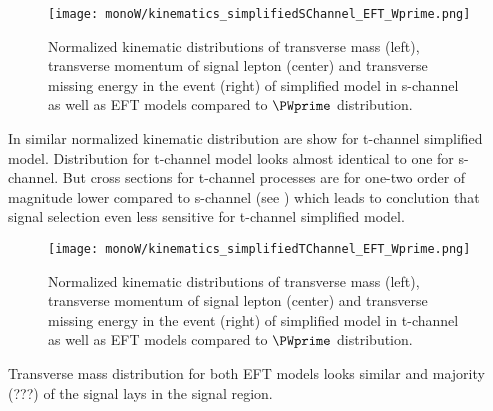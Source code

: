 

\begin{figure}[hb]
\texttt{[image: monoW/kinematics\_simplifiedSChannel\_EFT\_Wprime.png]}
\caption{Normalized kinematic distributions of transverse mass (left), transverse momentum of signal lepton (center) and transverse missing energy in the event (right) of simplified model in s-channel as well as EFT models compared to $\PWprime$ distribution.}
  \label{fig:kinematicsSChannel}
\end{figure}

In  similar normalized kinematic distribution are show for t-channel simplified model. Distribution for t-channel model looks almost identical to one
for s-channel. But cross sections for t-channel processes are for one-two order of magnitude lower compared to s-channel (see ) which leads to conclution
that signal selection even less sensitive for t-channel simplified model.

\begin{figure}[hb]
\texttt{[image: monoW/kinematics\_simplifiedTChannel\_EFT\_Wprime.png]}
\caption{Normalized kinematic distributions of transverse mass (left), transverse momentum of signal lepton (center) and transverse missing energy in the event (right) of simplified model in t-channel as well as EFT models compared to $\PWprime$ distribution.}
  \label{fig:kinematicsTChannel}
\end{figure}

Transverse mass distribution for both EFT models looks similar and majority (???) of the signal lays in the signal region. 


